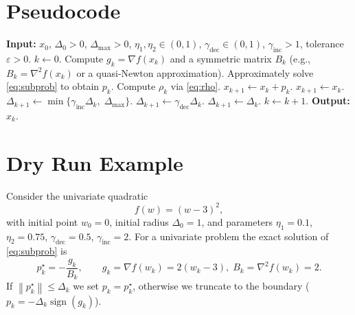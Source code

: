 \documentclass{article}
\newcommand{\norm}[1]{\left\lVert#1\right\rVert}
\begin{document}
\section*{Pseudocode}
\begin{algorithm}[H]
\caption{Trust Region Method with Approximate Subproblem Solution}
\begin{algorithmic}[1]
\State \textbf{Input:} $x_0$, $\Delta_0>0$, $\Delta_{\max}>0$,
$\eta_1,\eta_2\in(0,1)$, $\gamma_{\text{dec}}\in(0,1)$,
$\gamma_{\text{inc}}>1$, tolerance $\varepsilon>0$.
\State $k\gets 0$.
\While{$\norm{\nabla f(x_k)}>\varepsilon$ \textbf{and} $k<k_{\max}$}
    \State Compute $g_k=\nabla f(x_k)$ and a symmetric matrix $B_k$ 
          (e.g., $B_k=\nabla^2 f(x_k)$ or a quasi‑Newton approximation).
    \State Approximately solve \eqref{eq:subprob} to obtain $p_k$.
    \State Compute $\rho_k$ via \eqref{eq:rho}.
        \State $x_{k+1}\gets x_k+p_k$.
    \Else
        \State $x_{k+1}\gets x_k$.
    \EndIf
        \State $\Delta_{k+1}\gets \min\{\gamma_{\text{inc}}\Delta_k,\;\Delta_{\max}\}$.
        \State $\Delta_{k+1}\gets \gamma_{\text{dec}}\Delta_k$.
    \Else
        \State $\Delta_{k+1}\gets \Delta_k$.
    \EndIf
    \State $k\gets k+1$.
\EndWhile
\State \textbf{Output:} $x_k$.
\end{algorithmic}
\end{algorithm}

\section*{Dry Run Example}
Consider the univariate quadratic
\[
f(w)=(w-3)^2,
\]
with initial point $w_0=0$, initial radius $\Delta_0=1$, and parameters
$\eta_1=0.1$, $\eta_2=0.75$, $\gamma_{\text{dec}}=0.5$, $\gamma_{\text{inc}}=2$.
For a univariate problem the exact solution of \eqref{eq:subprob} is
\[
p_k^{\star}= -\frac{g_k}{B_k},
\qquad 
g_k = \nabla f(w_k)=2(w_k-3),\;
B_k = \nabla^2 f(w_k)=2 .
\]
If $\norm{p_k^{\star}}\le\Delta_k$ we set $p_k=p_k^{\star}$, otherwise we
truncate to the boundary ($p_k = -\Delta_k\operatorname{sign}(g_k)$).
\end{document}

